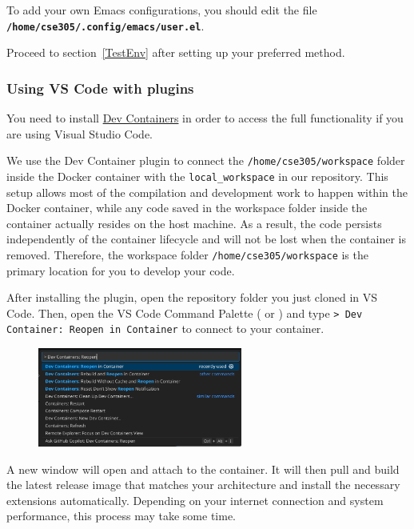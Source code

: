 \documentclass{extarticle}
\begin{document}
To add your own Emacs configurations, you should edit the file \textbf{\texttt{/home/cse305/.config/emacs/user.el}}.

Proceed to section~\ref{TestEnv} after setting up your preferred method.

\subsubsection{Using VS Code with plugins}
You need to install
\href{https://marketplace.visualstudio.com/items?itemName=ms-vscode-remote.remote-containers}{Dev Containers}
in order to access the full functionality if you are using Visual Studio Code.

We use the Dev Container plugin to connect the \texttt{/home/cse305/workspace} folder inside the Docker container with the \texttt{local\_workspace} in our repository.
This setup allows most of the compilation and development work to happen within the Docker container,
while any code saved in the workspace folder inside the container actually resides on the host machine.
As a result, the code persists independently of the container lifecycle and will not be lost when the container is removed.
Therefore, the workspace folder \texttt{/home/cse305/workspace} is the primary location for you to develop your code.

After installing the plugin, open the repository folder you just cloned in VS Code\@.
Then, open the VS Code Command Palette ( or ) and
type \texttt{> Dev Container: Reopen in Container} to connect to your container.

\begin{figure}[H]
  \centering
  \includegraphics[width=0.6\textwidth]{vscode_cmd_pat.png}
\end{figure}

A new window will open and attach to the container. It will then pull and build the latest release image that matches your architecture and install the necessary extensions automatically.
Depending on your internet connection and system performance, this process may take some time.
\end{document}
